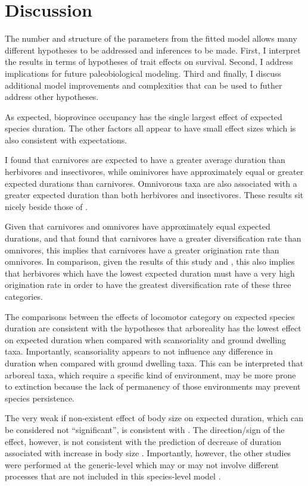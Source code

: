 \documentclass[12pt,letterpaper]{article}
\begin{document}
\section{Discussion}

The number and structure of the parameters from the fitted model allows many different hypotheses to be addressed and inferences to be made. First, I interpret the results in terms of hypotheses of trait effects on survival. Second, I address implications for future paleobiological modeling. Third and finally, I discuss additional model improvements and complexities that can be used to futher address other hypotheses.

As expected, bioprovince occupancy has the single largest effect of expected species duration. The other factors all appear to have small effect sizes which is also consistent with expectations.

I found that carnivores are expected to have a greater average duration than herbivores and insectivores, while ominivores have approximately equal or greater expected durations than carnivores. Omnivorous taxa are also associated with a greater expected duration than both herbivores and insectivores. These results sit nicely beside those of \citet{Price2012}.

Given that carnivores and omnivores have approximately equal expected durations, and that \citet{Price2012} found that carnivores have a greater diversification rate than omnivores, this implies that carnivores have a greater origination rate than omnivores. In comparison, given the results of this study and \citet{Price2012}, this also implies that herbivores which have the lowest expected duration must have a very high origination rate in order to have the greatest diversification rate of these three categories.

The comparisons between the effects of locomotor category on expected species duration are consistent with the hypotheses that arboreality has the lowest effect on expected duration when compared with scansoriality and ground dwelling taxa. Importantly, scansoriality appears to not influence any difference in duration when compared with ground dwelling taxa. This can be interpreted that arboreal taxa, which require a specific kind of environment, may be more prone to extinction because the lack of permanency of those environments may prevent species persistence. 

The very weak if non-existent effect of body size on expected duration, which can be considered not ``significant'', is consistent with \citet{Tomiya2013}. The direction/sign of the effect, however, is not consistent with the prediction of decrease of duration associated with increase in body size \citep{Liow2008}. Importantly, however, the other studies were performed at the generic-level which may or may not involve different processes that are not included in this species-level model \citep{Liow2008,Tomiya2013}.
\end{document}
